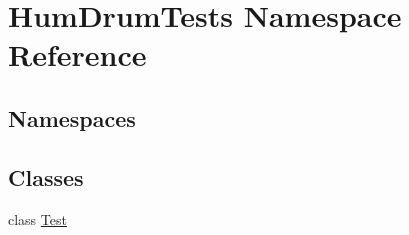 \hypertarget{namespaceHumDrumTests}{}\section{Hum\+Drum\+Tests Namespace Reference}
\label{namespaceHumDrumTests}
\subsection*{Namespaces}
\begin{DoxyCompactItemize}
\end{DoxyCompactItemize}
\subsection*{Classes}
\begin{DoxyCompactItemize}
\item 
class \hyperlink{classHumDrumTests_1_1Test}{Test}
\end{DoxyCompactItemize}
